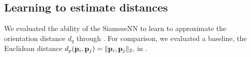 
\subsection{Learning to estimate distances}\label{sec:results:distance-estimation:learned}



We evaluated the ability of the SiameseNN to learn to approximate the orientation distance $d_q$ through .
For comparison, we evaluated a baseline, the Euclidean distance $d_p(\mathbf{p}_i,\mathbf{p}_j) = \|\mathbf{p}_i, \mathbf{p}_j\|_2$, in .

